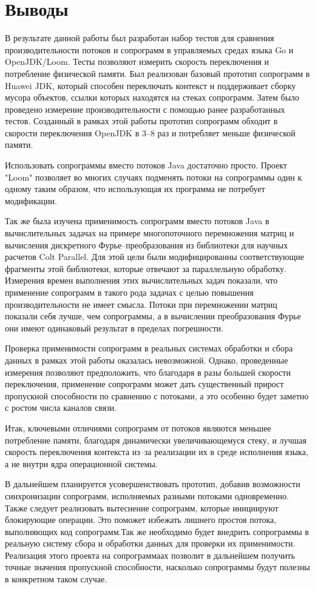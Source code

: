 \section{Выводы}
	В результате данной работы был разработан набор тестов для сравнения производительности потоков и сопрограмм в
	управляемых средах языка Go и OpenJDK/Loom. Тесты позволяют измерить скорость переключения и
	потребление физической памяти. Был реализован базовый прототип сопрограмм в
	Huawei JDK, который способен переключать контекст и поддерживает сборку мусора объектов, ссылки которых находятся
	на стеках сопрограмм. Затем было проведено измерение производительности с помощью ранее разработанных тестов.
	Созданный в рамках этой работы прототип сопрограмм обходит в скорости переключения
	OpenJDK в 3--8 раз и потребляет меньше физической памяти.
	\par
	Использовать сопрограммы вместо потоков Java достаточно просто. Проект "Loom"
	позволяет во многих случаях подменять потоки на сопрограммы один к одному таким образом,
	что использующая их программа не потребует модификации.
	\par
	Так же была изучена применимость сопрограмм вместо потоков Java в вычислительных задачах на
	примере многопоточного перемножения матриц и вычисления дискретного Фурье--преобразования 
	из библиотеки для научных расчетов Colt Parallel. Для этой цели были модифицированны соответствующие 
	фрагменты этой библиотеки, которые отвечают за параллельную обработку.
	Измерения времен выполнения этих вычислительных задач показали, что применение сопрограмм в 
	такого рода задачах с целью повышения производительности не имеет смысла. Потоки при 
	перемножении матриц показали себя лучше,
	чем сопрограммы, а в вычислении преобразования Фурье они имеют одинаковый результат в пределах погрешности.
	\par
	Проверка применимости сопрограмм в реальных системах обработки и сбора данных в рамках
	этой работы оказалась невозможной. Однако, проведенные измерения позволяют предположить,
	что благодаря в разы большей скорости переключения, применение сопрограмм может дать 
	существенный прирост пропускной способности по сравнению с потоками, а это особенно будет заметно
	с ростом числа каналов связи. 
	\par
	Итак, ключевыми отличиями сопрограмм от потоков являются меньшее потребление памяти, благодаря
	динамически увеличивающемуся стеку, и лучшая скорость переключения контекста из--за реализации 
	их в среде исполнения языка, а не внутри ядра операционной системы.
	\par
	В дальнейшем планируется усовершенствовать прототип, добавив возможности синхронизации
	сопрограмм, исполняемых разными потоками одновременно. Также следует реализовать вытеснение сопрограмм, которые
	инициируют блокирующие операции. Это поможет избежать лишнего простоя потока, выполняющих код сопрограмм.Так же
	необходимо будет внедрить сопрограммы в реальную систему сбора и обработки данных для проверки их 
	применимости. Реализация этого проекта на сопрограммаах позволит в дальнейшем получить точные значения
	пропускной способности, насколько сопрограммы будут полезны в конкретном таком случае.  
\clearpage
